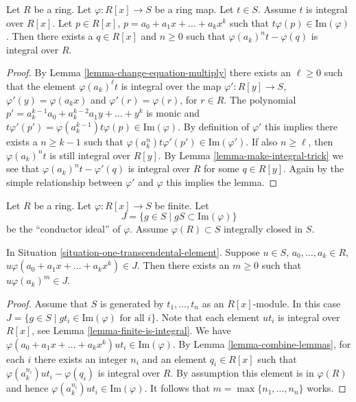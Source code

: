 \begin{lemma}
\label{lemma-combine-lemmas}
Let $R$ be a ring. Let $\varphi : R[x] \to S$ be
a ring map. Let $t \in S$. Assume $t$ is integral
over $R[x]$. Let $p \in R[x]$, $p = a_0 + a_1x + \ldots +
a_k x^k$ such that $t \varphi(p) \in \text{Im}(\varphi)$.
Then there exists a $q \in R[x]$ and $n \geq 0$
such that $\varphi(a_k)^n t - \varphi(q) $ is integral
over $R$.
\end{lemma}

\begin{proof}
By Lemma \ref{lemma-change-equation-multiply} there exists
an $\ell \geq 0$ such that
the element $\varphi(a_k)^\ell t$ is integral
over the map $\varphi' : R[y] \to S$, $\varphi'(y) =
\varphi(a_k x)$ and $\varphi'(r) = \varphi(r)$, for $r\in R$.
The polynomial $p' = a_k^{k-1} a_0 + a_k^{k-2} a_1 y
+ \ldots + y^k$ is monic and $t \varphi'(p')
= \varphi(a_k^{k-1}) t \varphi(p) \in \text{Im}(\varphi)$.
By definition of $\varphi'$ this implies there exists
a $n \geq k-1$ such that $\varphi(a_k^n)t \varphi'(p')
\in \text{Im}(\varphi')$. If also $n \geq \ell$, then
$\varphi(a_k)^n t$ is still integral over $R[y]$.
By Lemma \ref{lemma-make-integral-trick}
we see that $\varphi(a_k)^n t - \varphi'(q)$ is integral over $R$
for some $q \in R[y]$. Again by the simple relationship between
$\varphi'$ and $\varphi$ this implies the lemma.
\end{proof}

\begin{situation}
\label{situation-one-transcendental-element}
Let $R$ be a ring.
Let $\varphi : R[x] \to S$ be finite.
Let
$$
J = \{ g \in S \mid gS \subset \text{Im}(\varphi)\}
$$
be the ``conductor ideal'' of $\varphi$.
Assume $\varphi(R) \subset S$ integrally closed in $S$.
\end{situation}

\begin{lemma}
\label{lemma-leading-coefficient-in-J}
In Situation \ref{situation-one-transcendental-element}.
Suppose $u \in S$, $a_0, \ldots, a_k \in R$,
$u \varphi(a_0 + a_1x + \ldots + a_k x^k) \in J$.
Then there exists an $m \geq 0$ such that
$u \varphi(a_k)^m \in J$.
\end{lemma}

\begin{proof}
Assume that $S$ is generated by $t_1, \ldots, t_n$
as an $R[x]$-module. In this case
$J = \{ g \in S \mid gt_i \in \text{Im}(\varphi)\text{ for all }i\}$.
Note that each element $u t_i$ is integral over
$R[x]$, see Lemma \ref{lemma-finite-is-integral}.
We have $\varphi(a_0 + a_1x + \ldots + a_k x^k) u t_i \in
\text{Im}(\varphi)$. By Lemma \ref{lemma-combine-lemmas}, for
each $i$ there exists an integer $n_i$ and an element
$q_i \in R[x]$ such that $\varphi(a_k^{n_i}) u t_i - \varphi(q_i)$
is integral over $R$. By assumption this element is in $\varphi(R)$
and hence $\varphi(a_k^{n_i}) u t_i \in \text{Im}(\varphi)$.
It follows that $m = \max\{n_1, \ldots, n_n\}$ works.
\end{proof}

